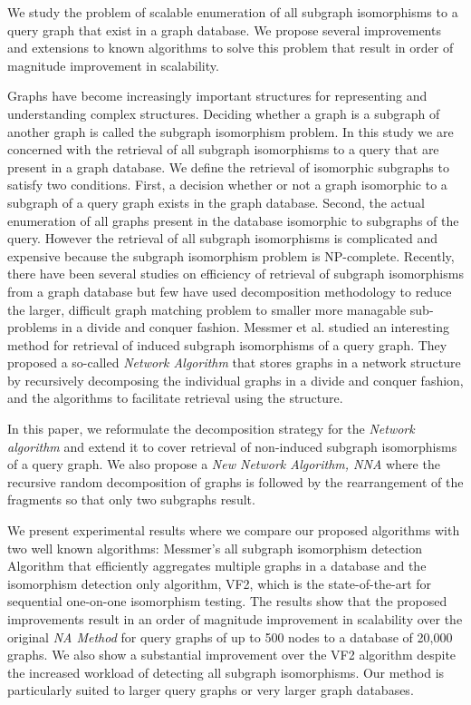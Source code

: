 We study the problem of scalable enumeration of all subgraph isomorphisms to a query graph that exist in a graph database. We  propose several improvements and extensions to known algorithms to solve this problem that result in order of magnitude improvement in scalability. 

Graphs have become increasingly important structures for representing and understanding complex structures. Deciding whether a graph is a subgraph of another graph is called the subgraph isomorphism problem. In this study we are concerned with the retrieval of all subgraph isomorphisms to a query that are present in a graph database.
We define the retrieval of isomorphic subgraphs to satisfy two conditions.  First, a decision whether or not a graph isomorphic to a subgraph of a query graph exists in the graph database. Second, the actual enumeration of all graphs present in the database isomorphic to subgraphs of the query. However the retrieval of all subgraph isomorphisms is complicated and expensive because the subgraph isomorphism problem is NP-complete.
Recently, there have been several studies on efficiency of retrieval of subgraph isomorphisms from a graph database but few have used decomposition methodology to reduce the larger, difficult graph matching problem to smaller more managable sub-problems in a divide and conquer fashion. Messmer et al. studied an interesting method for retrieval of induced subgraph isomorphisms of a query graph. They proposed a so-called \textit{Network Algorithm} that stores graphs  in a network structure  by recursively decomposing the individual graphs in a divide and conquer fashion, and the algorithms to facilitate retrieval using the structure.

In this paper, we reformulate the decomposition strategy for the \textit{Network algorithm} and extend it to cover retrieval of non-induced subgraph isomorphisms of a query graph. We also propose a  \textit{New  Network Algorithm, NNA} where the recursive random decomposition of graphs is followed by the rearrangement of the fragments so that only two subgraphs result.

We present experimental results where we compare our proposed algorithms with two well known algorithms: Messmer's all subgraph isomorphism detection Algorithm that efficiently aggregates multiple graphs in a database and the isomorphism detection only algorithm, VF2, which is the state-of-the-art for sequential one-on-one isomorphism testing. The results show that the proposed improvements result in an order of magnitude improvement in scalability over the original \textit{NA Method}  for query graphs of up to 500 nodes to a database of 20,000 graphs. We also show a substantial improvement over the VF2 algorithm despite the increased workload of detecting all subgraph isomorphisms. Our method is particularly suited to larger query graphs or very larger graph databases.

